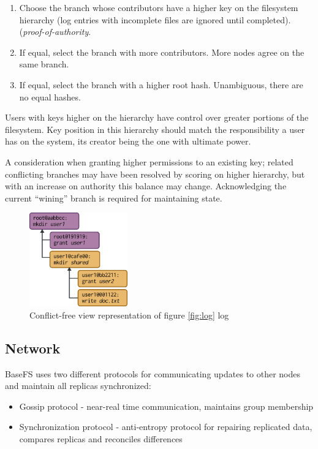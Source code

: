 \documentclass{sig-alternate}
\begin{document}
\begin{enumerate}
\item Choose the branch whose contributors have a higher key on the filesystem hierarchy (log entries with incomplete files are ignored until completed). (\textit{proof-of-authority}.
\item If equal, select the branch with more contributors. More nodes agree on the same branch.
\item If equal, select the branch with a higher root hash. Unambiguous, there are no equal hashes.
\end{enumerate}

Users with keys higher on the hierarchy have control over greater portions of the filesystem. Key position in this hierarchy should match the responsibility a user has on the system, its creator being the one with ultimate power.

A consideration when granting higher permissions to an existing key; related conflicting branches may have been resolved by scoring on higher hierarchy, but with an increase on authority this balance may change. Acknowledging the current ``wining'' branch is required for maintaining state.

\begin{figure}
\centering
\includegraphics[width=120pt]{imgs/view.png}
\caption{Conflict-free view representation of figure \ref{fig:log} log}
\label{fig:view}
\end{figure}


\subsection{Network} \label{network}

BaseFS uses two different protocols for communicating updates to other nodes and maintain all replicas synchronized:

\begin{itemize}
    \item Gossip protocol - near-real time communication, maintains group membership
    \item Synchronization protocol - anti-entropy protocol for repairing replicated data, compares replicas and reconciles differences
\end{itemize}
\end{document}
